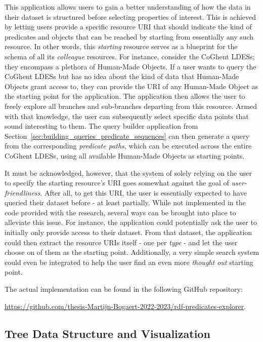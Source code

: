 This application allows users to gain a better understanding of how the data in their dataset is structured before selecting properties of interest. This is achieved by letting users provide a specific resource URI that should indicate the kind of predicates and objects that can be reached by starting from essentially any such resource. In other words, this \textit{starting} resource serves as a blueprint for the schema of all its \textit{colleague} resources. For instance, consider the CoGhent LDESs; they encompass a plethora of Human-Made Objects. If a user wants to query the CoGhent LDESs but has no idea about the kind of data that Human-Made Objects grant access to, they can provide the URI of any Human-Made Object as the starting point for the application. The application then allows the user to freely explore all branches and sub-branches departing from this resource. Armed with that knowledge, the user can subsequently select specific data points that sound interesting to them. The query builder application from Section~\ref{sec:building_queries_predicate_sequences} can then generate a query from the corresponding \textit{predicate paths}, which can be executed across the entire CoGhent LDESs, using all available Human-Made Objects as starting points.

It must be acknowledged, however, that the system of solely relying on the user to specify the starting resource's URI goes somewhat against the goal of \textit{user-friendliness}. After all, to get this URI, the user is essentially expected to have queried their dataset before - at least partially. While not implemented in the code provided with the research, several ways can be brought into place to alleviate this issue. For instance, the application could potentially ask the user to initially only provide access to their dataset. From that dataset, the application could then extract the resource URIs itself - one per \textit{type} - and let the user choose on of them as the starting point. Additionally, a very simple search system could even be integrated to help the user find an even more \textit{thought out} starting point.

The actual implementation can be found in the following GitHub repository:
\begin{center}
    \url{https://github.com/thesis-Martijn-Bogaert-2022-2023/rdf-predicates-explorer}.
\end{center}

\subsection{Tree Data Structure and Visualization}

